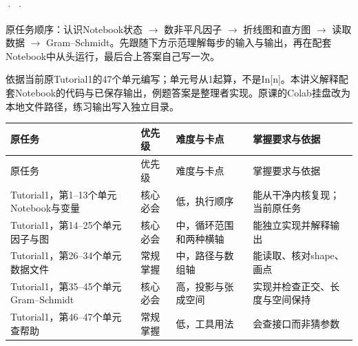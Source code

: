 






 ·  · 





原任务顺序：认识Notebook状态 \ensuremath{\to} 数非平凡因子 \ensuremath{\to} 折线图和直方图 \ensuremath{\to} 读取数据 \ensuremath{\to} Gram–Schmidt。先跟随下方示范理解每步的输入与输出，再在配套Notebook中从头运行，最后合上答案自己写一次。

依据当前原Tutorial1的47个单元编写；单元号从1起算，不是In[n]。本讲义解释配套Notebook的代码与已保存输出，例题答案是整理者实现。原课的Colab挂盘改为本地文件路径，练习输出写入独立目录。


\begingroup
\small\setlength{\tabcolsep}{3pt}
\renewcommand{\arraystretch}{1.22}
\begin{longtable}{@{}>{\raggedright\arraybackslash}p{}>{\raggedright\arraybackslash}p{}>{\raggedright\arraybackslash}p{}>{\raggedright\arraybackslash}p{}@{}}
\toprule
原任务 & 优先级 & 难度与卡点 & 掌握要求与依据 \\
\midrule\endfirsthead
原任务 & 优先级 & 难度与卡点 & 掌握要求与依据 \\
\midrule\endhead
\bottomrule\endfoot
Tutorial1，第1–13个单元 Notebook与变量 & 核心必会 & 低，执行顺序 & 能从干净内核复现；当前原任务 \\
Tutorial1，第14–25个单元 因子与图 & 核心必会 & 中，循环范围和两种横轴 & 能独立实现并解释输出 \\
Tutorial1，第26–34个单元 数据文件 & 常规掌握 & 中，路径与数组轴 & 能读取、核对shape、画点 \\
Tutorial1，第35–45个单元 Gram–Schmidt & 核心必会 & 高，投影与张成空间 & 实现并检查正交、长度与空间保持 \\
Tutorial1，第46–47个单元 查帮助 & 常规掌握 & 低，工具用法 & 会查接口而非猜参数 \\
\end{longtable}
\endgroup






